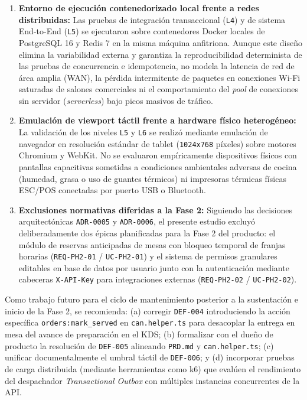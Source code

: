 \documentclass[stu,12pt,a4paper]{apa7}
\providecommand{\tightlist}{\setlength{\itemsep}{0pt}\setlength{\parskip}{0pt}}
\begin{document}
\begin{enumerate}
\def\labelenumi{\arabic{enumi}.}
\tightlist
\item
  \textbf{Entorno de ejecución contenedorizado local frente a redes distribuidas:} Las pruebas de integración transaccional (\texttt{L4}) y de sistema End-to-End (\texttt{L5}) se ejecutaron sobre contenedores Docker locales de PostgreSQL 16 y Redis 7 en la misma máquina anfitriona. Aunque este diseño elimina la variabilidad externa y garantiza la reproducibilidad determinista de las pruebas de concurrencia e idempotencia, no modela la latencia de red de área amplia (WAN), la pérdida intermitente de paquetes en conexiones Wi-Fi saturadas de salones comerciales ni el comportamiento del \emph{pool} de conexiones sin servidor (\emph{serverless}) bajo picos masivos de tráfico.
\item
  \textbf{Emulación de viewport táctil frente a hardware físico heterogéneo:} La validación de los niveles \texttt{L5} y \texttt{L6} se realizó mediante emulación de navegador en resolución estándar de tablet (\texttt{1024x768} píxeles) sobre motores Chromium y WebKit. No se evaluaron empíricamente dispositivos físicos con pantallas capacitivas sometidas a condiciones ambientales adversas de cocina (humedad, grasa o uso de guantes térmicos) ni impresoras térmicas físicas ESC/POS conectadas por puerto USB o Bluetooth.
\item
  \textbf{Exclusiones normativas diferidas a la Fase 2:} Siguiendo las decisiones arquitectónicas \texttt{ADR-{}\allowbreak{}0005} y \texttt{ADR-{}\allowbreak{}0006}, el presente estudio excluyó deliberadamente dos épicas planificadas para la Fase 2 del producto: el módulo de reservas anticipadas de mesas con bloqueo temporal de franjas horarias (\texttt{REQ-{}\allowbreak{}PH2-{}\allowbreak{}01} / \texttt{UC-{}\allowbreak{}PH2-{}\allowbreak{}01}) y el sistema de permisos granulares editables en base de datos por usuario junto con la autenticación mediante cabeceras \texttt{X-{}\allowbreak{}API-{}\allowbreak{}Key} para integraciones externas (\texttt{REQ-{}\allowbreak{}PH2-{}\allowbreak{}02} / \texttt{UC-{}\allowbreak{}PH2-{}\allowbreak{}02}).
\end{enumerate}

Como trabajo futuro para el ciclo de mantenimiento posterior a la sustentación e inicio de la Fase 2, se recomienda: (a) corregir \texttt{DEF-{}\allowbreak{}004} introduciendo la acción específica \texttt{\textquotesingle{}orders:\allowbreak{}mark\_\allowbreak{}served\textquotesingle{}} en \texttt{can.\allowbreak{}helper.\allowbreak{}ts} para desacoplar la entrega en mesa del avance de preparación en el KDS; (b) formalizar con el dueño de producto la resolución de \texttt{DEF-{}\allowbreak{}005} alineando \texttt{PRD.\allowbreak{}md} y \texttt{can.\allowbreak{}helper.\allowbreak{}ts}; (c) unificar documentalmente el umbral táctil de \texttt{DEF-{}\allowbreak{}006}; y (d) incorporar pruebas de carga distribuida (mediante herramientas como k6) que evalúen el rendimiento del despachador \emph{Transactional Outbox} con múltiples instancias concurrentes de la API.
\end{document}
